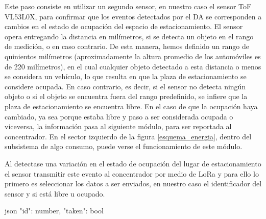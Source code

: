 Este paso consiste en utilizar un segundo sensor, en nuestro caso el sensor ToF VL53L0X, para confirmar que los eventos detectados por el DA se corresponden a cambios en el estado de ocupación del espacio de estacionamiento. El sensor opera entregando la distancia en milímetros, si se detecta un objeto en el rango de medición, o  en caso contrario. De esta manera, hemos definido un rango de quinientos milímetros (aproximadamente la altura promedio de los automóviles es de 220 milímetros), en el cual cualquier objeto detectado a esta distancia o menos se considera un vehículo, lo que resulta en que la plaza de estacionamiento se considere ocupada. En caso contrario, es decir, si el sensor no detecta ningún objeto o si el objeto se encuentra fuera del rango predefinido, se infiere que la plaza de estacionamiento se encuentra libre.
En el caso de que la ocupación haya cambiado, ya sea porque estaba libre y paso a ser considerada ocupada o viceversa, la información pasa al siguiente módulo, para ser reportada al concentrador.
En el sector izquierdo de la figura \ref{esquema_energia}, dentro del subsistema de algo consumo, puede verse el funcionamiento de este módulo.

 \label{title:transmition_node}
Al detectase una variación en el estado de ocupación del lugar de estacionamiento el sensor transmitir este evento al concentrador por medio de LoRa y para ello lo primero es seleccionar los datos a ser enviados, en nuestro caso el identificador del sensor y si está libre u ocupado.

\begin{sourcecode}{json}{}
    {
        "id": number,
        "taken": bool
    }
\end{sourcecode}


